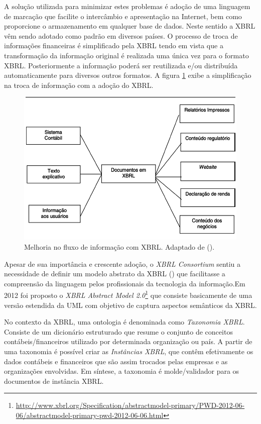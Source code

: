 \documentclass[msc,proposal,hidelot,hideabstract]{ppgccufmg} %
\begin{document}
A solução utilizada para minimizar estes problemas é adoção de uma linguagem de marcação que facilite o intercâmbio e apresentação na Internet, bem como proporcione o armazenamento em qualquer base de dados. Neste sentido a XBRL vêm sendo adotado como padrão em diversos países. O processo de troca de informações financeiras é simplificado pela XBRL tendo em vista que a transformação da informação original é realizada uma única vez para o formato XBRL. Posteriormente a informação poderá ser reutilizada e/ou distribuída automaticamente para diversos outros formatos. A figura \ref{fig:fluxo_info_xbrl} exibe a simplificação na troca de informação com a adoção do XBRL.

\begin{figure}[hbtp]
\centering
\includegraphics[width=.75\textwidth]{img/fluxo_info_xbrl.png}
\caption{Melhoria no fluxo de informação com XBRL. Adaptado de (\cite{hoffman2001xbrl}).}
\label{fig:fluxo_info_xbrl}
\end{figure}

Apesar de sua importância e crescente adoção, o \textit{XBRL Consortium} sentiu a necessidade de definir um modelo abstrato da XBRL (\cite{xbrl_preserve_promote_particite}) que facilitasse a compreensão da linguagem pelos profissionais da tecnologia da informação.Em 2012 foi proposto o \textit{XBRL Abstract Model 2.0}\footnote{\url{http://www.xbrl.org/Specification/abstractmodel-primary/PWD-2012-06-06/abstractmodel-primary-pwd-2012-06-06.html}} que consiste basicamente de uma versão estendida da UML com objetivo de captura aspectos semânticos da XBRL.

No contexto da XBRL, uma ontologia é denominada como \textit{Taxonomia XBRL}{}. Consiste de um dicionário estruturado que resume o conjunto de conceitos contábeis/financeiros utilizado por determinada organização ou país. A partir de uma taxonomia é possível criar as \textit{Instâncias XBRL}, que contêm efetivamente os dados contábeis e financeiros que são assim trocados pelas empresas e as organizações envolvidas. Em síntese, a taxonomia é molde/validador para os documentos de instância XBRL.
\end{document}
